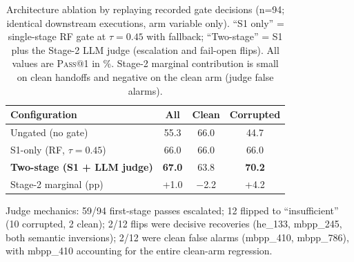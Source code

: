 \begin{table}[t]
\centering
\small
\caption{Architecture ablation by replaying recorded gate decisions (n=94; identical downstream executions, arm variable only). ``S1 only'' = single-stage RF gate at $\tau{=}0.45$ with fallback; ``Two-stage'' = S1 plus the Stage-2 LLM judge (escalation and fail-open flips). All values are \textsc{Pass@1} in \%. Stage-2 marginal contribution is small on clean handoffs and negative on the clean arm (judge false alarms).}
\label{tab:downstream_ablation}
\begin{tabular}{lccc}
\toprule
\textbf{Configuration} & \textbf{All} & \textbf{Clean} & \textbf{Corrupted} \\
\midrule
Ungated (no gate) & 55.3 & 66.0 & 44.7 \\
S1-only (RF, $\tau{=}0.45$) & 66.0 & 66.0 & 66.0 \\
\textbf{Two-stage (S1 + LLM judge)} & \textbf{67.0} & 63.8 & \textbf{70.2} \\
\midrule
Stage-2 marginal (pp) & +1.0 & $-$2.2 & +4.2 \\
\bottomrule
\end{tabular}
\vspace{-2pt}
\begin{flushleft}\small
Judge mechanics: 59/94 first-stage passes escalated; 12 flipped to ``insufficient'' (10 corrupted, 2 clean); 2/12 flips were decisive recoveries (he\_133, mbpp\_245, both semantic inversions); 2/12 were clean false alarms (mbpp\_410, mbpp\_786), with mbpp\_410 accounting for the entire clean-arm regression.
\end{flushleft}
\end{table}